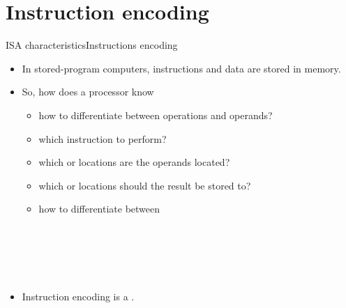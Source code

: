 \documentclass[]{slides}
\begin{document}
\section{Instruction encoding}
\begin{frame}{\acs{ISA} characteristics}{Instructions encoding}
  \begin{itemize}
      \item In stored-program computers, instructions and data are stored in memory.
    \item So, how does a processor know
    \begin{itemize}
        \item how to differentiate between operations and operands?
    	\item which instruction to perform?
    	\item which  or  locations are the operands located?
        \item which  or  locations should the result be stored to?
        \pauseprint
        \item how to differentiate between
	\end{itemize}
	~~~~~~\\
	~~~~~~\\
	~~~~~~\\
	~~~~~~\\
      \item Instruction encoding is a .
  \end{itemize}
\end{frame}
\end{document}
